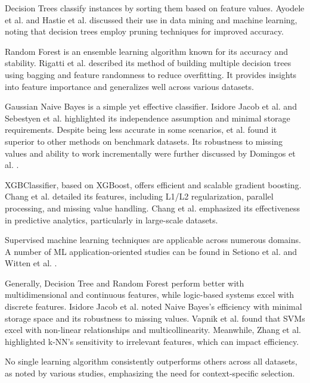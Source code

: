 \documentclass[pdflatex,sn-nature,Numbered]{sn-jnl}%
\theoremstyle{thmstyleone}%
\theoremstyle{thmstyletwo}%
\theoremstyle{thmstylethree}%
\begin{document}
\hspace*{1em} Decision Trees classify instances by sorting them based on feature values. Ayodele et al. \cite{ref2} and Hastie et al. \cite{ref5} discussed their use in data mining and machine learning, noting that decision trees employ pruning techniques for improved accuracy.

\hspace*{1em} Random Forest is an ensemble learning algorithm known for its accuracy and stability. Rigatti et al. \cite{ran1} described its method of building multiple decision trees using bagging and feature randomness to reduce overfitting. It provides insights into feature importance and generalizes well across various datasets.

\hspace*{1em} Gaussian Naive Bayes is a simple yet effective classifier. Isidore Jacob et al. \cite{nv1} and Sebestyen et al. \cite{nv2} highlighted its independence assumption and minimal storage requirements. Despite being less accurate in some scenarios, \citeauthor{nv3} et al. \cite{nv3} found it superior to other methods on benchmark datasets. Its robustness to missing values and ability to work incrementally were further discussed by Domingos et al. \cite{nv4}.

\hspace*{1em} XGBClassifier, based on XGBoost, offers efficient and scalable gradient boosting. Chang et al. \cite{xgb2} detailed its features, including L1/L2 regularization, parallel processing, and missing value handling. Chang et al. \cite{xgb} emphasized its effectiveness in predictive analytics, particularly in large-scale datasets.

\hspace*{1em} Supervised machine learning techniques are applicable across numerous domains. A number of ML application-oriented studies can be found in Setiono et al. \cite{ref6} and Witten et al. \cite{ref7}.

Generally, Decision Tree and Random Forest perform better with multidimensional and continuous features, while logic-based systems excel with discrete features. Isidore Jacob et al. \cite{nv1} noted Naive Bayes's efficiency with minimal storage space and its robustness to missing values. Vapnik et al. \cite{svm1} found that SVMs excel with non-linear relationships and multicollinearity. Meanwhile, Zhang et al. \cite{knn} highlighted k-NN’s sensitivity to irrelevant features, which can impact efficiency.

No single learning algorithm consistently outperforms others across all datasets, as noted by various studies, emphasizing the need for context-specific selection.
\end{document}
